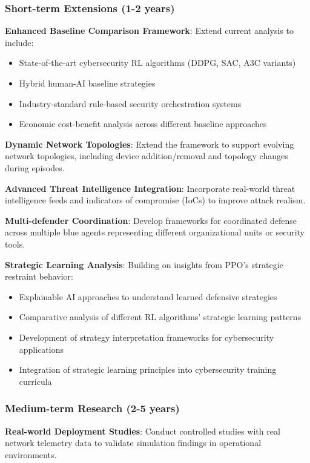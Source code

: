 \documentclass[12pt,oneside,a4paper]{article}
\theoremstyle{definition}
\theoremstyle{plain}
\begin{document}
\subsubsection{Short-term Extensions (1-2 years)}

\textbf{Enhanced Baseline Comparison Framework}: Extend current analysis to include:
\begin{itemize}
\item State-of-the-art cybersecurity RL algorithms (DDPG, SAC, A3C variants)
\item Hybrid human-AI baseline strategies
\item Industry-standard rule-based security orchestration systems
\item Economic cost-benefit analysis across different baseline approaches
\end{itemize}

\textbf{Dynamic Network Topologies}: Extend the framework to support evolving network topologies, including device addition/removal and topology changes during episodes.

\textbf{Advanced Threat Intelligence Integration}: Incorporate real-world threat intelligence feeds and indicators of compromise (IoCs) to improve attack realism.

\textbf{Multi-defender Coordination}: Develop frameworks for coordinated defense across multiple blue agents representing different organizational units or security tools.

\textbf{Strategic Learning Analysis}: Building on insights from PPO's strategic restraint behavior:
\begin{itemize}
\item Explainable AI approaches to understand learned defensive strategies
\item Comparative analysis of different RL algorithms' strategic learning patterns
\item Development of strategy interpretation frameworks for cybersecurity applications
\item Integration of strategic learning principles into cybersecurity training curricula
\end{itemize}

\subsubsection{Medium-term Research (2-5 years)}

\textbf{Real-world Deployment Studies}: Conduct controlled studies with real network telemetry data to validate simulation findings in operational environments.
\end{document}
